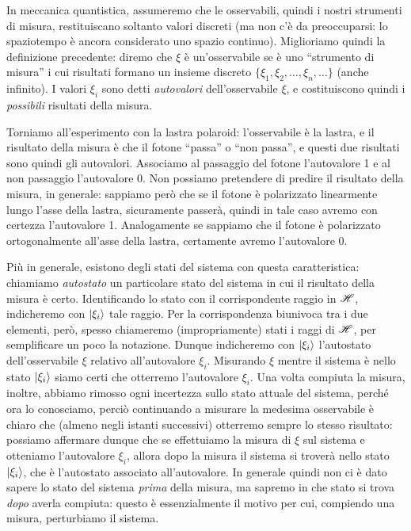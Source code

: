 In meccanica quantistica, assumeremo che le osservabili, quindi i nostri strumenti di misura, restituiscano soltanto valori discreti (ma non c'è da preoccuparsi: lo spaziotempo è ancora considerato uno spazio continuo).
Miglioriamo quindi la definizione precedente: diremo che $\xi$ è un'osservabile se è uno ``strumento di misura'' i cui risultati formano un insieme discreto $\{\xi_1,\xi_2,\dots,\xi_n,\dots\}$ (anche infinito).
I valori $\xi_i$ sono detti \emph{autovalori} dell'osservabile $\xi$, e costituiscono quindi i \emph{possibili} risultati della misura.

Torniamo all'esperimento con la lastra polaroid: l'osservabile è la lastra, e il risultato della misura è che il fotone ``passa'' o ``non passa'', e questi due risultati sono quindi gli autovalori.
Associamo al passaggio del fotone l'autovalore 1 e al non passaggio l'autovalore 0.
Non possiamo pretendere di predire il risultato della misura, in generale: sappiamo però che se il fotone è polarizzato linearmente lungo l'asse della lastra, sicuramente passerà, quindi in tale caso avremo con certezza l'autovalore 1.
Analogamente se sappiamo che il fotone è polarizzato ortogonalmente all'asse della lastra, certamente avremo l'autovalore 0.

Più in generale, esistono degli stati del sistema con questa caratteristica: chiamiamo \emph{autostato} un particolare stato del sistema in cui il risultato della misura è certo.
Identificando lo stato con il corrispondente raggio in $\mathscr H$, indicheremo con $\left|{\xi_i}\right\rangle$ tale raggio.
Per la corrispondenza biunivoca tra i due elementi, però, spesso chiameremo (impropriamente) stati i raggi di $\mathscr H$, per semplificare un poco la notazione.
Dunque indicheremo con $\left|{\xi_i}\right\rangle$ l'autostato dell'osservabile $\xi$ relativo all'autovalore $\xi_i$.
Misurando $\xi$ mentre il sistema è nello stato $\left|{\xi_i}\right\rangle$ siamo certi che otterremo l'autovalore $\xi_i$.
Una volta compiuta la misura, inoltre, abbiamo rimosso ogni incertezza sullo stato attuale del sistema, perch\'e ora lo conosciamo, perciò continuando a misurare la medesima osservabile è chiaro che (almeno negli istanti successivi) otterremo sempre lo stesso risultato: possiamo affermare dunque che se effettuiamo la misura di $\xi$ sul sistema e otteniamo l'autovalore $\xi_i$, allora dopo la misura il sistema si troverà nello stato $\left|{\xi_i}\right\rangle$, che è l'autostato associato all'autovalore.
In generale quindi non ci è dato sapere lo stato del sistema \emph{prima} della misura, ma sapremo in che stato si trova \emph{dopo} averla compiuta: questo è essenzialmente il motivo per cui, compiendo una misura, perturbiamo il sistema.

